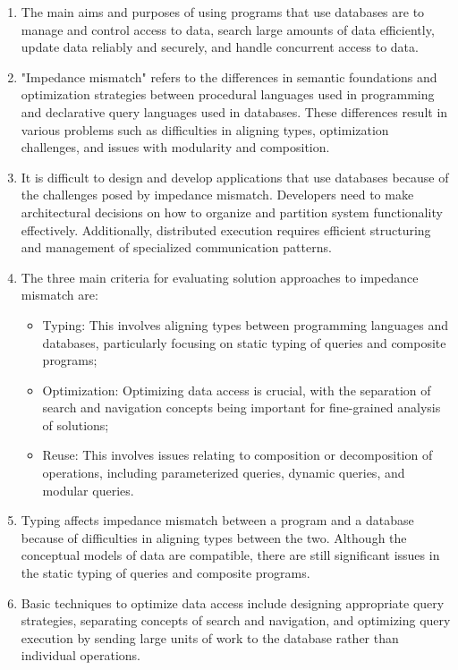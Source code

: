 \documentclass[a4paper,14pt, unknownkeysallowed]{extreport}
\begin{document}
\begin{enumerate}
	\item The main aims and purposes of using programs that use databases are to manage and control access to data, search large amounts of data efficiently, update data reliably and securely, and handle concurrent access to data.
	
	\item "Impedance mismatch" refers to the differences in semantic foundations and optimization strategies between procedural languages used in programming and declarative query languages used in databases. These differences result in various problems such as difficulties in aligning types, optimization challenges, and issues with modularity and composition.
	
	\item It is difficult to design and develop applications that use databases because of the challenges posed by impedance mismatch. Developers need to make architectural decisions on how to organize and partition system functionality effectively. Additionally, distributed execution requires efficient structuring and management of specialized communication patterns.
	
	\item The three main criteria for evaluating solution approaches to impedance mismatch are:
	
	\begin{itemize}
		\item Typing: This involves aligning types between programming languages and databases, particularly focusing on static typing of queries and composite programs;
		\item Optimization: Optimizing data access is crucial, with the separation of search and navigation concepts being important for fine-grained analysis of solutions;
		\item Reuse: This involves issues relating to composition or decomposition of operations, including parameterized queries, dynamic queries, and modular queries.
	\end{itemize}
	
	\item Typing affects impedance mismatch between a program and a database because of difficulties in aligning types between the two. Although the conceptual models of data are compatible, there are still significant issues in the static typing of queries and composite programs.
	
	\item Basic techniques to optimize data access include designing appropriate query strategies, separating concepts of search and navigation, and optimizing query execution by sending large units of work to the database rather than individual operations.
	

\end{enumerate}
\end{document}
